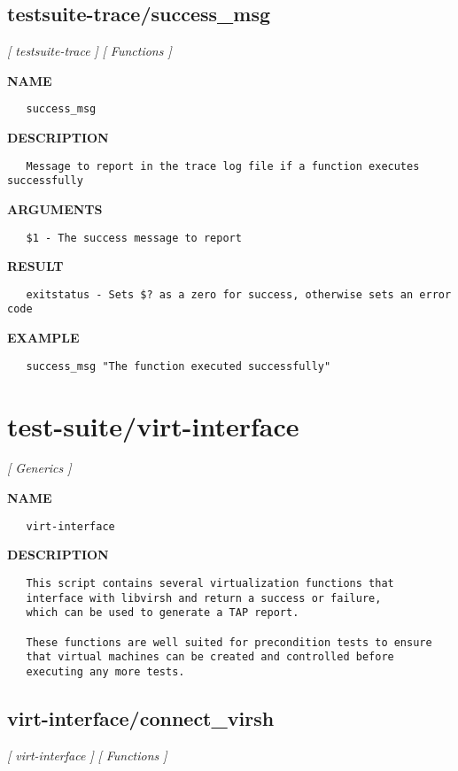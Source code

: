 \subsection{testsuite-trace/success\_msg}
\textsl{[ testsuite-trace ]}
\textsl{[ Functions ]}

\label{ch:robo56}
\label{ch:testsuite_trace_success_msg}
\textbf{NAME}
\begin{verbatim}
   success_msg
\end{verbatim}
\textbf{DESCRIPTION}
\begin{verbatim}
   Message to report in the trace log file if a function executes successfully
\end{verbatim}
\textbf{ARGUMENTS}
\begin{verbatim}
   $1 - The success message to report
\end{verbatim}
\textbf{RESULT}
\begin{verbatim}
   exitstatus - Sets $? as a zero for success, otherwise sets an error code
\end{verbatim}
\textbf{EXAMPLE}
\begin{verbatim}
   success_msg "The function executed successfully"
\end{verbatim}
\newpage
\section{test-suite/virt-interface}
\textsl{[ Generics ]}

\label{ch:robo44}
\label{ch:test_suite_virt_interface}
\textbf{NAME}
\begin{verbatim}
   virt-interface
\end{verbatim}
\textbf{DESCRIPTION}
\begin{verbatim}
   This script contains several virtualization functions that
   interface with libvirsh and return a success or failure, 
   which can be used to generate a TAP report.

   These functions are well suited for precondition tests to ensure
   that virtual machines can be created and controlled before 
   executing any more tests.
\end{verbatim}
\newpage
\subsection{virt-interface/connect\_virsh}
\textsl{[ virt-interface ]}
\textsl{[ Functions ]}

